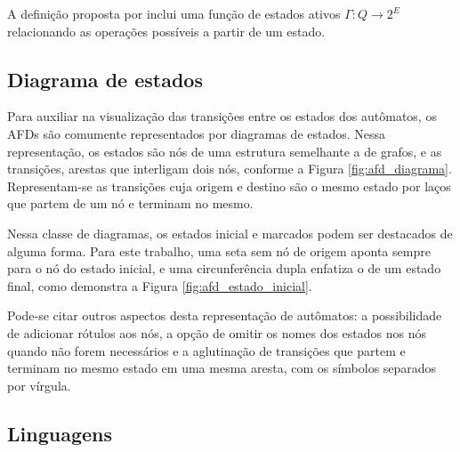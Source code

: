 A definição proposta por  inclui uma função de estados ativos $\Gamma : Q \rightarrow 2^E$ relacionando as operações possíveis a partir de um estado.

\subsection{Diagrama de estados}

Para auxiliar na visualização das transições entre os estados dos autômatos, os AFDs são comumente representados por diagramas de estados. Nessa representação, os estados são nós de uma estrutura semelhante a de grafos, e as transições, arestas que interligam dois nós, conforme a Figura \ref{fig:afd_diagrama}. Representam-se as transições cuja origem e destino são o mesmo estado por laços que partem de um nó e terminam no mesmo.


Nessa classe de diagramas, os estados inicial e marcados podem ser destacados de alguma forma. Para este trabalho, uma seta sem nó de origem aponta sempre para o nó do estado inicial, e uma circunferência dupla enfatiza o de um estado final, como demonstra a Figura \ref{fig:afd_estado_inicial}.


Pode-se citar outros aspectos desta representação de autômatos: a possibilidade de adicionar rótulos aos nós, a opção de omitir os nomes dos estados nos nós quando não forem necessários e a aglutinação de transições que partem e terminam no mesmo estado em uma mesma aresta, com os símbolos separados por vírgula.

\subsection{Linguagens}

